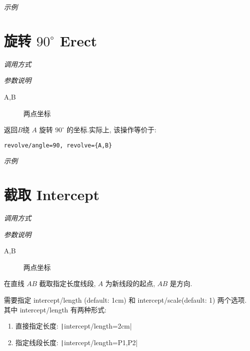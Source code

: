 \emph{示例}


\section{旋转 $90^\circ$ Erect}

\emph{调用方式}

\begin{tcolorbox}{}
\end{tcolorbox}

\emph{参数说明}

\begin{description}
  \item[A,B] 两点坐标
\end{description}

返回$B$绕 $A$ 旋转 $90^\circ$ 的坐标.实际上, 该操作等价于:

\begin{verbatim}
revolve/angle=90, revolve={A,B}
\end{verbatim}

\emph{示例}


\section{截取 Intercept}

\emph{调用方式}

\begin{tcolorbox}{}
\end{tcolorbox}

\emph{参数说明}

\begin{description}
  \item[A,B] 两点坐标
\end{description}

在直线 $AB$ 截取指定长度线段, $A$ 为新线段的起点, $AB$ 是方向.

需要指定 intercept/length (default: 1cm) 和 intercept/scale(default: 1) 两个选项.
其中 intercept/length 有两种形式:

\begin{enumerate}
  \item 直接指定长度: \texttt|intercept/length=2cm|
  \item 指定线段长度: \texttt|intercept/length={P1,P2}|
\end{enumerate}

